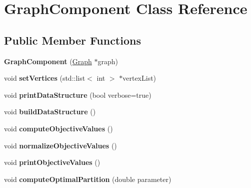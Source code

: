 \hypertarget{classGraphComponent}{\section{Graph\-Component Class Reference}
\label{classGraphComponent}
}
\subsection*{Public Member Functions}
\begin{DoxyCompactItemize}
\item 
\hypertarget{classGraphComponent_add1de7615139f01b7fbf155eb361e171}{{\bfseries Graph\-Component} (\hyperlink{classGraph}{Graph} $\ast$graph)}\label{classGraphComponent_add1de7615139f01b7fbf155eb361e171}

\item 
\hypertarget{classGraphComponent_a842a0bbe5e833bac1d1b43aefc685fa9}{void {\bfseries set\-Vertices} (std\-::list$<$ int $>$ $\ast$vertex\-List)}\label{classGraphComponent_a842a0bbe5e833bac1d1b43aefc685fa9}

\item 
\hypertarget{classGraphComponent_adaaf2cb4ac58af1995f1de5667b94e74}{void {\bfseries print\-Data\-Structure} (bool verbose=true)}\label{classGraphComponent_adaaf2cb4ac58af1995f1de5667b94e74}

\item 
\hypertarget{classGraphComponent_a467e8ea8da9b7b265daa3ceb5b624411}{void {\bfseries build\-Data\-Structure} ()}\label{classGraphComponent_a467e8ea8da9b7b265daa3ceb5b624411}

\item 
\hypertarget{classGraphComponent_a19e5e9cadd30dde9cf8309064016816a}{void {\bfseries compute\-Objective\-Values} ()}\label{classGraphComponent_a19e5e9cadd30dde9cf8309064016816a}

\item 
\hypertarget{classGraphComponent_aa206dc3321d1436bd8c957ee19a0952e}{void {\bfseries normalize\-Objective\-Values} ()}\label{classGraphComponent_aa206dc3321d1436bd8c957ee19a0952e}

\item 
\hypertarget{classGraphComponent_ade21156a32aab43d55d9bbbb07d3b9c5}{void {\bfseries print\-Objective\-Values} ()}\label{classGraphComponent_ade21156a32aab43d55d9bbbb07d3b9c5}

\item 
\hypertarget{classGraphComponent_a2d2b90ed866f4ae7173737558cdca0cd}{void {\bfseries compute\-Optimal\-Partition} (double parameter)}\label{classGraphComponent_a2d2b90ed866f4ae7173737558cdca0cd}


\end{DoxyCompactItemize}
